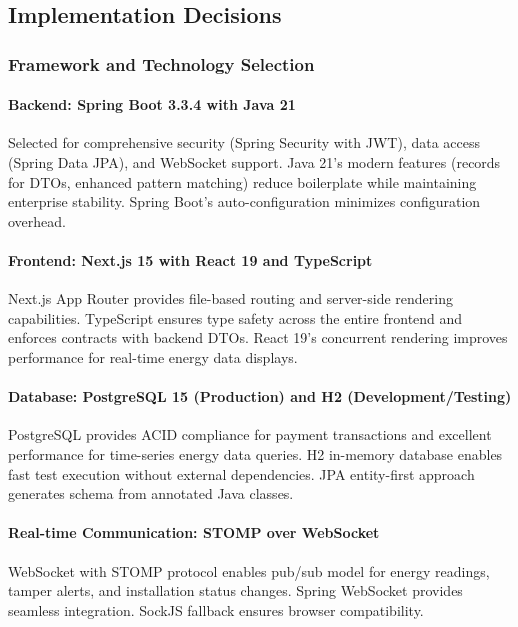 \subsection{Implementation Decisions}
\label{subsec:implementation-decisions}

\subsubsection{Framework and Technology Selection}
\label{subsubsec:component-justification}

\paragraph{Backend: Spring Boot 3.3.4 with Java 21}
Selected for comprehensive security (Spring Security with JWT), data access (Spring Data JPA), and WebSocket support. Java 21's modern features (records for DTOs, enhanced pattern matching) reduce boilerplate while maintaining enterprise stability. Spring Boot's auto-configuration minimizes configuration overhead.

\paragraph{Frontend: Next.js 15 with React 19 and TypeScript}
Next.js App Router provides file-based routing and server-side rendering capabilities. TypeScript ensures type safety across the entire frontend and enforces contracts with backend DTOs. React 19's concurrent rendering improves performance for real-time energy data displays.

\paragraph{Database: PostgreSQL 15 (Production) and H2 (Development/Testing)}
PostgreSQL provides ACID compliance for payment transactions and excellent performance for time-series energy data queries. H2 in-memory database enables fast test execution without external dependencies. JPA entity-first approach generates schema from annotated Java classes.

\paragraph{Real-time Communication: STOMP over WebSocket}
WebSocket with STOMP protocol enables pub/sub model for energy readings, tamper alerts, and installation status changes. Spring WebSocket provides seamless integration. SockJS fallback ensures browser compatibility.

